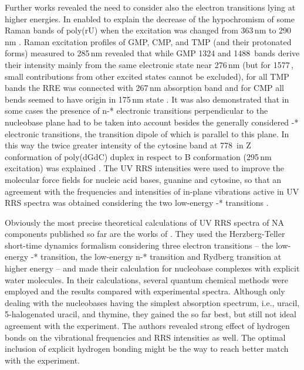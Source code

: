 Further works revealed the need to consider also the electron transitions lying
at higher energies.
In enabled to explain the decrease of the hypochromism of some Raman bands of
poly(rU) when the excitation was changed from 363\,nm to 290\,nm
\parencite{Chinsky1980}.
Raman excitation profiles of GMP, CMP, and TMP (and their protonated forms)
measured to 285\,nm revealed that while GMP 1324 and 1488\,\icm{} bands derive
their intensity mainly from the same electronic state near 276\,nm (but for
1577\,\icm{}, small contributions from other excited states cannot be
excluded), for all TMP bands the RRE was connected with 267\,nm absorption band
and for CMP all bends seemed to have origin in 175\,nm state
\parencite{Samanta1982}.
It was also demonstrated that in some cases the presence of n-* electronic
transitions perpendicular to the nucleobase plane had to be taken into account
besides the generally considered -* electronic transitions, the
transition dipole of which is parallel to this plane.
In this way the twice greater intensity of the cytosine band at 778\,\icm{} in
Z conformation of poly(dGdC) duplex in respect to B conformation (295\,nm
excitation) was explained
\parencite{Chinsky1984}.
The UV RRS intensities were used to improve the molecular force fields for
nucleic acid bases, guanine and cytosine, so that an agreement with the
frequencies and intensities of in-plane vibrations active in UV RRS spectra was
obtained considering the two low-energy -* transitions
\parencite{Lagant1991}.

Obviously the most precise theoretical calculations of UV RRS spectra of NA
components published so far are the works of
\textcite{%
	Sun2014,%
	Sun2015,%
	Sun2017%
}.
They used the Herzberg-Teller short-time dynamics formalism considering three
electron transitions --
	the low-energy -* transition,
	the low-energy n-* transition
	and Rydberg transition at higher energy
-- and made their calculation for nucleobase complexes with explicit water
molecules.
In their calculations, several quantum chemical methods were employed and the
results compared with experimental spectra.
Although only dealing with the nucleobases having the simplest absorption
spectrum, i.e., uracil, 5-halogenated uracil, and thymine, they gained the so
far best, but still not ideal agreement with the experiment.
The authors revealed strong effect of hydrogen bonds on the vibrational
frequencies and RRS intensities as well.
The optimal inclusion of explicit hydrogen bonding might be the way to reach
better match with the experiment.

